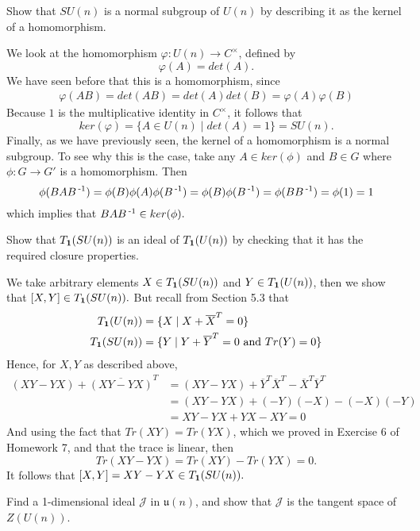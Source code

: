 \documentclass[12pt,onecolumn]{article}
\begin{document}
\begin{exercise}
Show that $SU(n)$ is a normal subgroup of $U(n)$ by describing it as the kernel of a homomorphism.
\end{exercise}
\begin{answer}
We look at the homomorphism $\varphi: U(n) \rightarrow C^{\times}$, defined by $$ \varphi(A) = det(A).$$
We have seen before that this is a homomorphism, since 
\begin{align*}
    \varphi(AB) = det(AB) = det(A)det(B) = \varphi(A)\varphi(B)
\end{align*}
Because $1$ is the multiplicative identity in $C^{\times}$, it follows that $$ker(\varphi) = \{ A \in U(n) \mid det(A) = 1 \} = SU(n).$$
Finally, as we have previously seen, the kernel of a homomorphism is a normal subgroup. To see why this is the case, take any $A \in ker(\phi)$ and $B \in G$ where $\phi: G \rightarrow G'$ is a homomorphism. Then
$$\phi(B A B\operatorname{^{-1}}) = \phi(B)\phi(A)\phi(B\operatorname{^{-1}}) = \phi(B)\phi(B\operatorname{^{-1}}) = \phi(BB\operatorname{^{-1}}) = \phi(1) = 1$$
which implies that $BAB\operatorname{^{-1}} \in ker(\phi).$
\end{answer}
\begin{exercise}
Show that $T_{\operatorname{\mathbf{1}}}(SU(n))$ is an ideal of $T_{\operatorname{\mathbf{1}}}(U(n))$ by checking that it has the required closure properties.
\end{exercise}
\begin{answer}
We take arbitrary elements $X \in T_{\operatorname{\mathbf{1}}}(SU(n)) $ and $Y \in T_{\operatorname{\mathbf{1}}}(U(n))$, then we show that $[X,Y] \in T_{\operatorname{\mathbf{1}}}(SU(n)).$
But recall from Section 5.3 that
\begin{align*}
    T_{\operatorname{\mathbf{1}}}(U(n)) &= \{ X \mid X + \overline{X}^T = 0\} \\
    T_{\operatorname{\mathbf{1}}}(SU(n)) &= \{ Y \mid Y + \overline{Y}^T = 0 \text{ and } Tr(Y) = 0\} 
\end{align*}
Hence, for $X,Y$ as described above,
\begin{align*}
    (XY-YX) + \overline{(XY-YX)}^T &= (XY-YX) + \overline{Y}^T\overline{X}^T- \overline{X}^T\overline{Y}^T \\
    &= (XY-YX) + (-Y)(-X) - (-X)(-Y) \\
    &= XY-YX + YX - XY = 0
\end{align*}
And using the fact that $Tr(XY) = Tr(YX)$, which we proved in Exercise 6 of Homework 7, and that the trace is linear, then
$$ Tr(XY-YX) = Tr(XY) - Tr(YX) = 0. $$
It follows that $[X,Y] = XY-YX \in T_{\operatorname{\mathbf{1}}}(SU(n)).$
\end{answer}
\begin{exercise}
 Find a 1-dimensional ideal $\mathcal{J}$ in $\mathfrak{u}(n)$, and show that $\mathcal{J}$ is the tangent space of $Z(U(n))$. 
\end{exercise}
\end{document}

